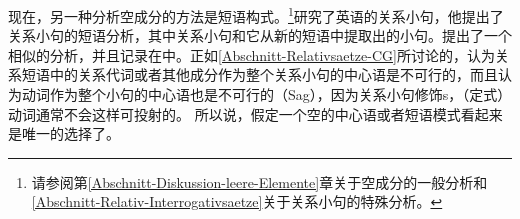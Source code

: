 现在，另一种分析空成分的方法是短语构式。\footnote{
请参阅第\ref{Abschnitt-Diskussion-leere-Elemente}章关于空成分的一般分析和\ref{Abschnitt-Relativ-Interrogativsaetze}关于关系小句的特殊分析。
}\cite{Sag97a}研究了英语的关系小句，他提出了关系小句的短语分析，其中关系小句和它从新的短语中提取出的小句。\citet{Babel}提出了一个相似的分析，并且记录在中。正如\ref{Abschnitt-Relativsaetze-CG}所讨论的，认为关系短语中的关系代词或者其他成分作为整个关系小句的中心语是不可行的，而且认为动词作为整个小句的中心语也是不可行的（Sag），因为关系小句修饰\nbar{}s，（定式）动词通常不会这样可投射的。
所以说，假定一个空的中心语或者短语模式看起来是唯一的选择了。
